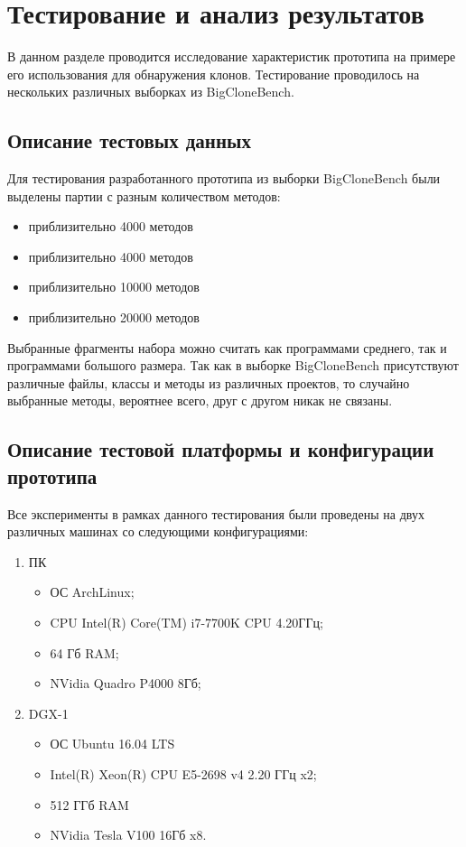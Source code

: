 \chapter{Тестирование и анализ результатов}

В данном разделе проводится исследование характеристик прототипа на примере его использования для обнаружения клонов. Тестирование проводилось на нескольких различных выборках из BigCloneBench.

\section{Описание тестовых данных}

Для тестирования разработанного прототипа из выборки BigCloneBench были выделены партии с разным количеством методов:

\begin{itemize}
\setlength\itemsep{0mm}
\item приблизительно 4000 методов
\item приблизительно 4000 методов
\item приблизительно 10000 методов
\item приблизительно 20000 методов
\end{itemize}

Выбранные фрагменты набора можно считать как программами среднего, так и программами большого размера. Так как в выборке BigCloneBench присутствуют различные файлы, классы и методы из различных проектов, то случайно выбранные методы, вероятнее всего, друг с другом никак не связаны.

\section{Описание тестовой платформы и конфигурации прототипа}

Все эксперименты в рамках данного тестирования были проведены на двух различных машинах со следующими конфигурациями:

\begin{enumerate}
\setlength\itemsep{0mm}
\item ПК
\begin{itemize}
\setlength\itemsep{0mm}
\item ОС ArchLinux;
\item CPU Intel(R) Core(TM) i7-7700K CPU 4.20ГГц;
\item 64 Гб RAM;
\item NVidia Quadro P4000 8Гб;
\end{itemize}
\item DGX-1
\begin{itemize}
\setlength\itemsep{0mm}
\item ОС Ubuntu 16.04 LTS
\item Intel(R) Xeon(R) CPU E5-2698 v4 2.20 ГГц x2;
\item 512 ГГб RAM
\item NVidia Tesla V100 16Гб x8.
\end{itemize}
\end{enumerate}

